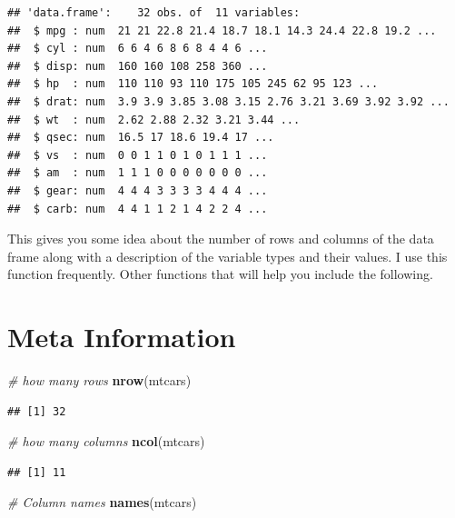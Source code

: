 \documentclass[]{book}
\newenvironment{Shaded}{\begin{snugshade}}{\end{snugshade}}
\newcommand{\KeywordTok}[1]{\textcolor[rgb]{0.13,0.29,0.53}{\textbf{#1}}}
\newcommand{\CommentTok}[1]{\textcolor[rgb]{0.56,0.35,0.01}{\textit{#1}}}
\newcommand{\NormalTok}[1]{#1}
\begin{document}
\begin{verbatim}
## 'data.frame':    32 obs. of  11 variables:
##  $ mpg : num  21 21 22.8 21.4 18.7 18.1 14.3 24.4 22.8 19.2 ...
##  $ cyl : num  6 6 4 6 8 6 8 4 4 6 ...
##  $ disp: num  160 160 108 258 360 ...
##  $ hp  : num  110 110 93 110 175 105 245 62 95 123 ...
##  $ drat: num  3.9 3.9 3.85 3.08 3.15 2.76 3.21 3.69 3.92 3.92 ...
##  $ wt  : num  2.62 2.88 2.32 3.21 3.44 ...
##  $ qsec: num  16.5 17 18.6 19.4 17 ...
##  $ vs  : num  0 0 1 1 0 1 0 1 1 1 ...
##  $ am  : num  1 1 1 0 0 0 0 0 0 0 ...
##  $ gear: num  4 4 4 3 3 3 3 4 4 4 ...
##  $ carb: num  4 4 1 1 2 1 4 2 2 4 ...
\end{verbatim}

This gives you some idea about the number of rows and columns of the
data frame along with a description of the variable types and their
values. I use this function frequently. Other functions that will help
you include the following.

\section{Meta Information}\label{meta-information}

\begin{Shaded}
\begin{Highlighting}[]
\CommentTok{# how many rows}
\KeywordTok{nrow}\NormalTok{(mtcars) }
\end{Highlighting}
\end{Shaded}

\begin{verbatim}
## [1] 32
\end{verbatim}

\begin{Shaded}
\begin{Highlighting}[]
\CommentTok{# how many columns}
\KeywordTok{ncol}\NormalTok{(mtcars) }
\end{Highlighting}
\end{Shaded}

\begin{verbatim}
## [1] 11
\end{verbatim}

\begin{Shaded}
\begin{Highlighting}[]
\CommentTok{# Column names}
\KeywordTok{names}\NormalTok{(mtcars)}
\end{Highlighting}
\end{Shaded}
\end{document}
